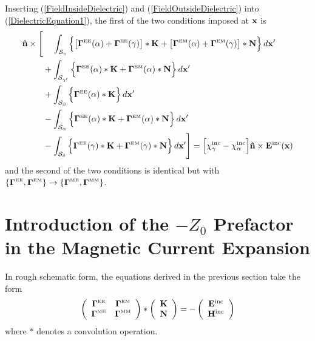 \documentclass[dvips,letterpaper]{article}
\begin{document}
Inserting (\ref{FieldInsideDielectric}) and 
(\ref{FieldOutsideDielectric}) into (\ref{DielectricEquation1}), 
the first of the two conditions imposed at $\mathbf{x}$ is
\begin{align}
\mathbf{\hat n}\times
 \Bigg[  &\hphantom{+}\,\,\int_{\mathcal{S_\gamma}}
           \Big\{ \big[\boldsymbol{\Gamma}^{\hbox{\tiny{EE}}}(\alpha) + \boldsymbol{\Gamma}^{\hbox{\tiny{EE}}}(\gamma)\big]
                   *\mathbf{K} 
                + \big[\boldsymbol{\Gamma}^{\hbox{\tiny{EM}}}(\alpha) + \boldsymbol{\Gamma}^{\hbox{\tiny{EM}}}(\gamma)\big]
                   *\mathbf{N} 
           \Big\} \, d\mathbf{x}^\prime
\nonumber \\
         &+\int_{\mathcal{S}_{\gamma^\prime}}
           \Big\{ \boldsymbol{\Gamma}^{\hbox{\tiny{EE}}}(\alpha)*\mathbf{K} 
                 +\boldsymbol{\Gamma}^{\hbox{\tiny{EM}}}(\alpha)*\mathbf{N} 
           \Big\} \, d\mathbf{x}^\prime
\nonumber \\
         &+\int_{\mathcal{S_\beta}} 
           \Big\{ \boldsymbol{\Gamma}^{\hbox{\tiny{EE}}}(\alpha)*\mathbf{K} \Big\} \, d\mathbf{x}^\prime
\nonumber \\
         &-\int_{\mathcal{S_\alpha}}
           \Big\{ \boldsymbol{\Gamma}^{\hbox{\tiny{EE}}}(\alpha)*\mathbf{K} 
                 +\boldsymbol{\Gamma}^{\hbox{\tiny{EM}}}(\alpha)*\mathbf{N} 
           \Big\} \, d\mathbf{x}^\prime
\nonumber \\
         &-\int_{\mathcal{S_\delta}} 
           \Big\{ \boldsymbol{\Gamma}^{\hbox{\tiny{EE}}}(\gamma)*\mathbf{K} 
                 +\boldsymbol{\Gamma}^{\hbox{\tiny{EM}}}(\gamma)*\mathbf{N} 
           \Big\} \, d\mathbf{x}^\prime
 \Bigg]
= \Big[\chi^{\hbox{\scriptsize{inc}}}_\gamma - \chi^{\hbox{\scriptsize{inc}}}_\alpha\Big] 
   \mathbf{\hat n}\times \mathbf{E}^{\hbox{\scriptsize{inc}}}(\mathbf{x})
\label{DielectricEquationBreakdown}
\end{align}
and the second of the two conditions is identical 
but with 
$\{\boldsymbol{\Gamma}^{\hbox{\tiny{EE}}}, \boldsymbol{\Gamma}^{\hbox{\tiny{EM}}}\} \to 
 \{\boldsymbol{\Gamma}^{\hbox{\tiny{ME}}}, \boldsymbol{\Gamma}^{\hbox{\tiny{MM}}}\}$.

\newpage
\section{Introduction of the $-Z_0$ Prefactor in the 
         Magnetic Current Expansion} 

In rough schematic form, the equations derived in the 
previous section take the form 
$$ \left( \begin{array}{cc}
   \boldsymbol{\Gamma}^{\hbox{\tiny{EE}}} & \boldsymbol{\Gamma}^{\hbox{\tiny{EM}}} \\
   \boldsymbol{\Gamma}^{\hbox{\tiny{ME}}} & \boldsymbol{\Gamma}^{\hbox{\tiny{MM}}} \\
   \end{array} \right)
   *
   \left( \begin{array}{c} \mathbf{K} \\  \mathbf{N}\end{array}\right)
   = 
   -
   \left( \begin{array}{c}
   \mathbf{E}^{\hbox{\scriptsize{inc}}} \\
   \mathbf{H}^{\hbox{\scriptsize{inc}}} \\
   \end{array}\right)
$$
where $*$ denotes a convolution operation.
\end{document}
